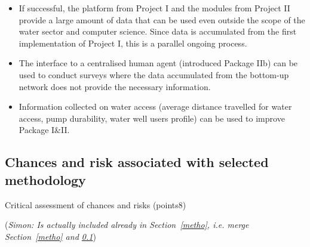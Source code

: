 \documentclass[11pt]{article}
\newcommand{\simon}[1]{\vspace{1em}(\emph{Simon: #1})\vspace{1em}}
\begin{document}
\begin{itemize}
 \item If successful, the platform from Project I and the modules from Project II provide a large amount of data that can be used even outside the scope of the water sector and computer science. Since data is accumulated from the first implementation of Project I, this is a parallel ongoing process.
 \item The interface to a centralised human agent (introduced Package IIb) can be used to conduct surveys where the data accumulated from the bottom-up network does not provide the necessary information.
 
 \item Information collected on water access (average distance travelled for water access, pump durability, water well users profile) can be used to improve Package I\&II.
\end{itemize}



\subsection{Chances and risk associated with selected methodology}\label{risk}
Critical assessment of chances and risks (points8)

\simon{Is actually included already in Section~\ref{metho}, i.e. merge Section~\ref{metho} and \ref{risk}}
\end{document}
